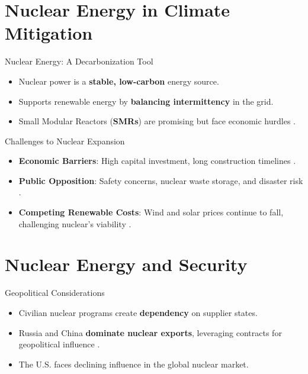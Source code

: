 \documentclass{beamer}
\begin{document}
\section{Nuclear Energy in Climate Mitigation}
\begin{frame}{Nuclear Energy: A Decarbonization Tool}
    \begin{itemize}
        \item Nuclear power is a \textbf{stable, low-carbon} energy source.
        \item Supports renewable energy by \textbf{balancing intermittency} in the grid.
        \item Small Modular Reactors (\textbf{SMRs}) are promising but face economic hurdles \cite{DUFFEY2005535}.
    \end{itemize}
\end{frame}


\begin{frame}{Challenges to Nuclear Expansion}
    \begin{itemize}
        \item \textbf{Economic Barriers}: High capital investment, long construction timelines \cite{KESSIDES2012185}.
        \item \textbf{Public Opposition}: Safety concerns, nuclear waste storage, and disaster risk \cite{CORNER20114823}.
        \item \textbf{Competing Renewable Costs}: Wind and solar prices continue to fall, challenging nuclear's viability \cite{LOVINS2022107122}.
    \end{itemize}
\end{frame}


\section{Nuclear Energy and Security}
\begin{frame}{Geopolitical Considerations}
    \begin{itemize}
        \item Civilian nuclear programs create \textbf{dependency} on supplier states.
        \item Russia and China \textbf{dominate nuclear exports}, leveraging contracts for geopolitical influence \cite{Nguyen}.
        \item The U.S. faces declining influence in the global nuclear market.
    \end{itemize}
\end{frame}
\end{document}
